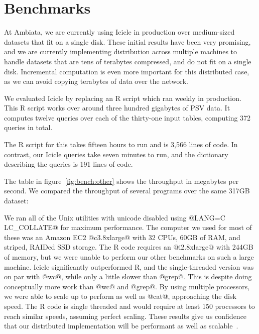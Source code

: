 \section{Benchmarks}
\label{s:Benchmarks}


At Ambiata, we are currently using Icicle in production over medium-sized datasets that fit on a single disk.
These initial results have been very promising, and we are currently implementing distribution across multiple machines to handle datasets that are tens of terabytes compressed, and do not fit on a single disk.
Incremental computation is even more important for this distributed case, as we can avoid copying terabytes of data over the network.

We evaluated Icicle by replacing an R script which ran weekly in production.
This R script works over around three hundred gigabytes of PSV data.
It computes twelve queries over each of the thirty-one input tables, computing 372 queries in total.

The R script for this takes fifteen hours to run and is 3,566 lines of code.
In contrast, our Icicle queries take seven minutes to run, and the dictionary describing the queries is 191 lines of code.

The table in figure~\ref{fig:bench:other} shows the throughput in megabytes per second.
We compared the throughput of several programs over the same 317GB dataset:

We ran all of the Unix utilities with unicode disabled using @LANG=C LC_COLLATE@ for maximum performance.
The computer we used for most of these was an Amazon EC2 @c3.8xlarge@ with 32 CPUs, 60GB of RAM, and striped, RAIDed SSD storage.
The R code requires an @i2.8xlarge@ with 244GB of memory, but we were unable to perform our other benchmarks on such a large machine.
Icicle significantly outperformed R, and the single-threaded version was on par with @wc@, while only a little slower than @grep@.
This is despite doing conceptually more work than @wc@ and @grep@.
By using multiple processors, we were able to scale up to perform as well as @cat@, approaching the disk speed.
The R code is single threaded and would require at least 150 processors to reach similar speeds, assuming perfect scaling.
These results give us confidence that our distributed implementation will be performant as well as scalable~\cite{mcsherry2015scalability}.

